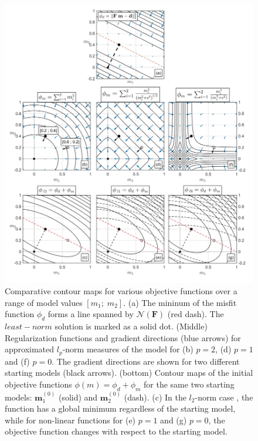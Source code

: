 \begin{figure}[h!]
\centering
\includegraphics[scale=0.52]{IRLS_toy_l0l1l2}
\caption{Comparative contour maps for various objective functions over a range of model values $[ m_1 ;\;m_2 ]$. (a) The mininum of the misfit function $\phi_d$ forms a line spanned by $\mathcal{N} (\mathbf{F})$ (red dash). The $least-norm$ solution is marked as a solid dot. (Middle) Regularization functions and gradient directions (blue arrows) for approximated $l_p$-norm measures of the model for (b) $p=2$, (d) $p=1$ and (f) $p=0$.
The gradient directions are shown for two different starting models  (black arrows). 
(bottom) Contour maps of the initial objective functions $\phi(m) = \phi_d + \phi_m$ for the same two starting models: $\mathbf{m}^{(0)}_1$ (solid) and $\mathbf{m}^{(0)}_2$ (dash). (c) In the $l_2$-norm case , the function has a global minimum regardless of the starting model, while for non-linear functions for (e) $p=1$ and (g) $p=0$, the objective function changes with respect to the starting model.}
\label{fig:IRLS_toy}
\end{figure}

